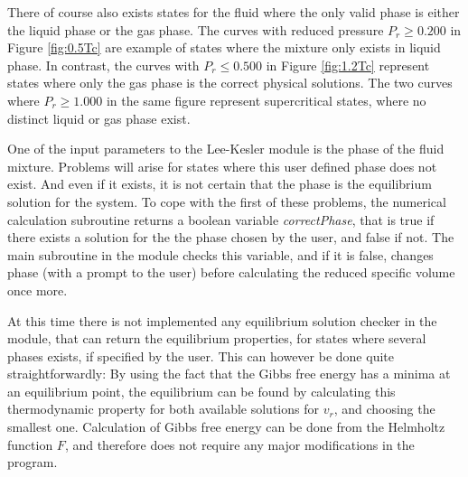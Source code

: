 \documentclass[english]{../thermomemo/thermomemo}
\numberwithin{equation}{section}
\begin{document}
There of course also exists states for the fluid where the only valid phase is either the liquid phase or the gas phase. The curves with reduced pressure $P_r \geq 0.200$ in Figure \ref{fig:0.5Tc} are example of states where the mixture only exists in liquid phase. In contrast, the curves with $P_r \leq 0.500$ in Figure \ref{fig:1.2Tc} represent states where only the gas phase is the correct physical solutions. The two curves where $P_r \geq 1.000$ in the same figure represent supercritical states, where no distinct liquid or gas phase exist. 

One of the input parameters to the Lee-Kesler module is the phase of the fluid mixture. Problems will arise for states where this user defined phase does not exist. And even if it exists, it is not certain that the phase is the equilibrium solution for the system. To cope with the first of these problems, the numerical calculation subroutine returns a boolean variable \textit{correctPhase}, that is true if there exists a solution for the the phase chosen by the user, and false if not. The main subroutine in the module checks this variable, and if it is false, changes phase (with a prompt to the user) before calculating the reduced specific volume once more. 

At this time there is not implemented any equilibrium solution checker in the module, that can return the equilibrium properties, for states where several phases exists, if specified by the user. This can however be done quite straightforwardly: By using the fact that the Gibbs free energy has a minima at an equilibrium point, the equilibrium can be found by calculating this thermodynamic property for both available solutions for $v_r$, and choosing the smallest one. Calculation of Gibbs free energy can be done from the Helmholtz function $F$, and therefore does not require any major modifications in the program.
\end{document}

